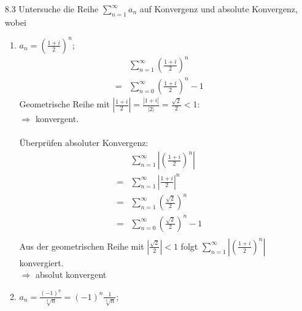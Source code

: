 \documentclass{HM}
\begin{document}
\begin{enumerate}
\item[8.3] Untersuche die Reihe $\sum\limits_{n=1}^\infty a_n$ auf Konvergenz und absolute Konvergenz, wobei\\
\begin{enumerate}

\item $a_n=\left(\frac{1+i}{2}\right)^n$;
\begin{align*}
 	&\sum\limits_{n=1}^\infty\left(\frac{1+i}{2}\right)^n\\
	=&\sum\limits_{n=0}^\infty\left(\frac{1+i}{2}\right)^n-1
\end{align*}
Geometrische Reihe mit $|\frac{1+i}{2}| = \frac{|1+i|}{|2|} = \frac{\sqrt{2}}{2} < 1$:\\
$\Rightarrow$ konvergent.\\\\
Überprüfen absoluter Konvergenz:\\
\begin{align*}
	&\sum\limits_{n=1}^\infty\left|\left(\frac{1+i}{2}\right)^n\right|\\
	=&\sum\limits_{n=1}^\infty\left|\frac{1+i}{2}\right|^n\\
	=&\sum\limits_{n=1}^\infty\left(\frac{\sqrt{2}}{2}\right)^n\\
	=&\sum\limits_{n=0}^\infty\left(\frac{\sqrt{2}}{2}\right)^n-1\\
\end{align*}
Aus der geometrischen Reihe mit $|\frac{\sqrt{2}}{2}| < 1$ folgt $\sum\limits_{n=1}^\infty\left|\left(\frac{1+i}{2}\right)^n\right|$ konvergiert.\\
$\Rightarrow$ absolut konvergent\\

\newpage
\item $a_n=\frac{(-1)^n}{\sqrt[3]{n}}=(-1)^n\frac{1}{\sqrt[3]{n}}$;\\


\end{enumerate}
\end{enumerate}
\end{document}
